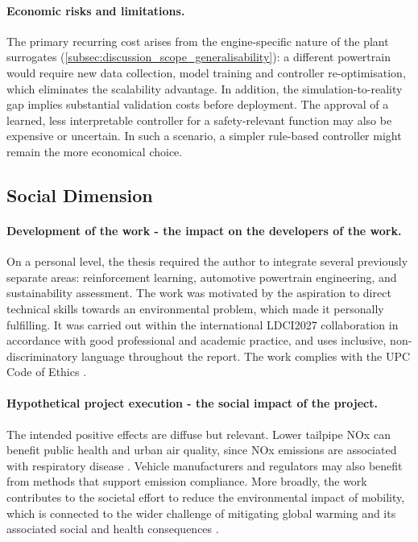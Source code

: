 \paragraph{Economic risks and limitations.} The primary recurring cost arises from the engine-specific nature of the plant surrogates (\autoref{subsec:discussion_scope_generalisability}): a different powertrain would require new data collection, model training and controller re-optimisation, which eliminates the scalability advantage. In addition, the simulation-to-reality gap implies substantial validation costs before deployment. The approval of a learned, less interpretable controller for a safety-relevant function may also be expensive or uncertain. In such a scenario, a simpler rule-based controller might remain the more economical choice.

\subsection{Social Dimension}

\paragraph{Development of the work - the impact on the developers of the work.} On a personal level, the thesis required the author to integrate several previously separate areas: reinforcement learning, automotive powertrain engineering, and sustainability assessment. The work was motivated by the aspiration to direct technical skills towards an environmental problem, which made it personally fulfilling. It was carried out within the international \ac{LDCI2027} collaboration in accordance with good professional and academic practice, and uses inclusive, non-discriminatory language throughout the report. The work complies with the UPC Code of Ethics \cite{universitat_politecnica_de_catalunya_code_2022}.

\paragraph{Hypothetical project execution - the social impact of the project.} The intended positive effects are diffuse but relevant. Lower tailpipe \ac{NOx} can benefit public health and urban air quality, since \ac{NOx} emissions are associated with respiratory disease \cite{european_union_regulation_2024, european_union_regulation_2007, core_writing_team_climate_2023}. Vehicle manufacturers and regulators may also benefit from methods that support emission compliance. More broadly, the work contributes to the societal effort to reduce the environmental impact of mobility, which is connected to the wider challenge of mitigating global warming and its associated social and health consequences \cite{core_writing_team_climate_2023}.

